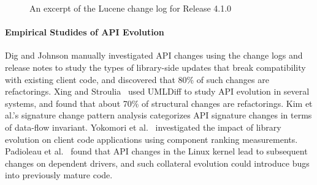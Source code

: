 \documentclass[runningheads,a4paper]{llncs}
\begin{document}
\begin{figure}
\centering
{}
\caption{An excerpt of the Lucene change log for Release 4.1.0~\cite{releasenote}}
\label{fig:releasenote}
\end{figure}

\paragraph{Empirical Studides of API Evolution} 
Dig and Johnson \cite{Dig2005} manually investigated API changes using the change logs and release notes to study the types of library-side updates that break compatibility with existing client code, and discovered that 80\% of such changes are refactorings. Xing and Stroulia~\cite{Xing2006:apievol} used UMLDiff to study API evolution in several systems, and found that about 70\% of structural changes are refactorings. Kim et al.'s signature change pattern analysis \cite{Kim2006:apievol} categorizes API signature changes in terms of data-flow invariant. Yokomori et al.~\cite{Yokomori2009:apiimpact} investigated the impact of library evolution on client code applications using component ranking measurements. Padioleau et al.~\cite{Padioleau2006} found that API changes in the Linux kernel lead to subsequent changes on dependent drivers, and such collateral evolution could introduce bugs into previously mature code. 
\end{document}
